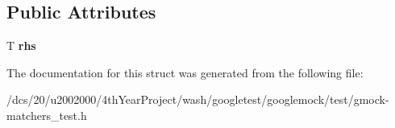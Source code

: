 \subsection*{Public Attributes}
\begin{DoxyCompactItemize}
\item 
\mbox{\label{structtesting_1_1gmock__matchers__test_1_1GtestGreaterThanMatcher_a697cd7885fad63d9e54e7648e3c3065f}} 
T {\bfseries rhs}
\end{DoxyCompactItemize}


The documentation for this struct was generated from the following file\+:\begin{DoxyCompactItemize}
\item 
/dcs/20/u2002000/4th\+Year\+Project/wash/googletest/googlemock/test/gmock-\/matchers\+\_\+test.\+h\end{DoxyCompactItemize}
